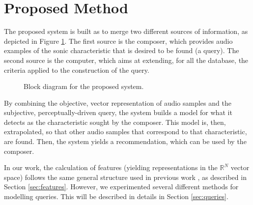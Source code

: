 \documentclass{article}
\begin{document}
\section{Proposed Method}\label{sec:method}
The proposed system is built as to merge two different sources of
information, as depicted in Figure \ref{fig:block-diagram}. The first
source is the composer, which provides audio examples of the sonic
characteristic that is desired to be found (a query). The second
source is the computer, which aims at extending, for all the database,
the criteria applied to the construction of the query.
\begin{figure}[ht!]
\centering
{}
\label{fig:block-diagram}
\caption{Block diagram for the proposed system.}
\end{figure}

By combining the objective, vector representation of audio samples and
the subjective, perceptually-driven query, the system builds a
model for what it detects as the characteristic sought by the
composer. This model is, then, extrapolated, so that other audio
samples that correspond to that characteristic, are found. Then, the
system yields a recommendation, which can be used by the composer.

In our work, the calculation of features (yielding representations in
the $\mathbb{R}^N$ vector space) follows the same general structure
used in previous work \cite{Tzanetakis2002,Helen2010}, as described in
Section \ref{sec:features}. However, we experimented several different
methods for modelling queries. This will be described in details in
Section \ref{sec:queries}.
\end{document}
